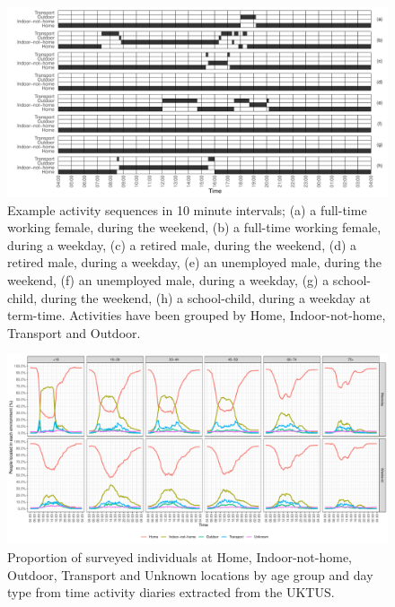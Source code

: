 \documentclass{article}
\begin{document}
\begin{figure}[!htbp]
	\centering
	\includegraphics[width=\linewidth]{Figures/TimeUseExamples}	
	\caption{Example activity sequences in 10 minute intervals; (a) a full-time working female, during the weekend, (b) a full-time working female, during a weekday, (c) a retired male, during the weekend, (d) a retired male, during a weekday, (e) an unemployed male, during the weekend, (f) an unemployed male, during a weekday, (g) a school-child, during the weekend, (h) a school-child, during a weekday at term-time. Activities have been grouped by Home, Indoor-not-home, Transport and Outdoor.} \label{fig::TimeUseExamples}
\end{figure}

\begin{figure}[!htbp]
	\centering
	\includegraphics[width=0.95\linewidth]{Figures/TimeUse_AgeGr_DayType}	
	\caption{Proportion of surveyed individuals at Home, Indoor-not-home, Outdoor, Transport and Unknown locations by age group and day type from time activity diaries extracted from the UKTUS.}
	\label{fig::propageday}
\end{figure}
\end{document}
